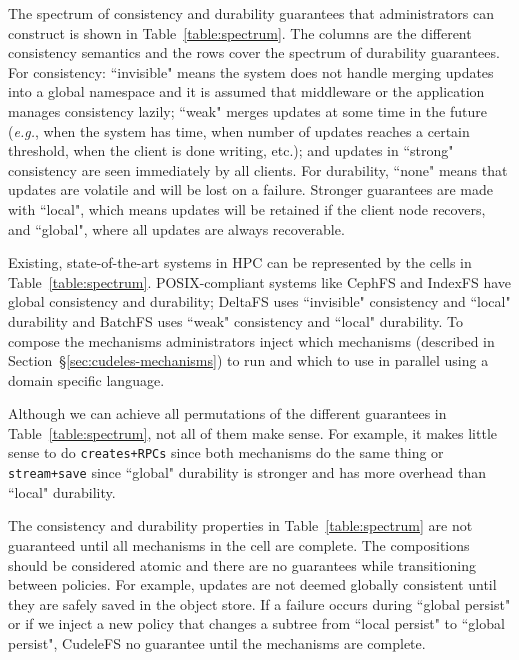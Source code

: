 The spectrum of consistency and durability guarantees that administrators can
construct is shown in Table~\ref{table:spectrum}. The columns are the different
consistency semantics and the rows cover the spectrum of durability guarantees.
For consistency: ``invisible" means the system does not handle merging updates
into a global namespace and it is assumed that middleware or the application
manages consistency lazily; ``weak" merges updates at some time in the
future ({\it e.g.}, when the system has time, when number of updates reaches a
certain threshold, when the client is done writing, etc.); and updates in
``strong" consistency are seen immediately by all clients. For durability,
``none" means that updates are volatile and will be lost on a failure. Stronger
guarantees are made with ``local", which means updates will be retained if the
client node recovers, and ``global", where all updates are always recoverable.

Existing, state-of-the-art systems in HPC can be represented by the cells in
Table~\ref{table:spectrum}.  POSIX-compliant systems like CephFS and IndexFS
have global consistency and durability; DeltaFS uses ``invisible" consistency
and ``local" durability and BatchFS uses ``weak" consistency and ``local"
durability.  To compose the mechanisms administrators inject which mechanisms
(described in Section~\S\ref{sec:cudeles-mechanisms}) to run and which to use
in parallel using a domain specific language. 

Although we can achieve all permutations of the different guarantees in
Table~\ref{table:spectrum}, not all of them make sense. For example, it
makes little sense to do \texttt{creates+RPCs} since both mechanisms do the same
thing or \texttt{stream+save} since ``global" durability is stronger and has
more overhead than ``local" durability. 

The consistency and durability properties in Table~\ref{table:spectrum} are not
guaranteed until all mechanisms in the cell are complete. The compositions
should be considered atomic and there are no guarantees while transitioning
between policies. For example, updates are not deemed globally consistent until
they are safely saved in the object store. If a failure occurs during ``global
persist" or if we inject a new policy that changes a subtree from ``local
persist" to ``global persist", CudeleFS no guarantee until the mechanisms are
complete.

